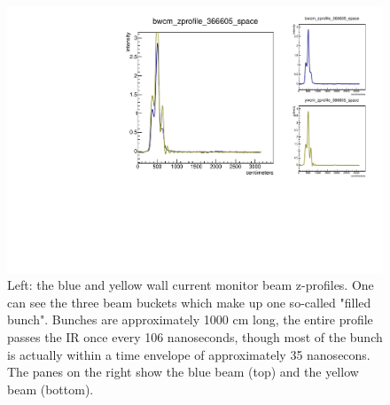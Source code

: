 \begin{figure}
\begin{center}
\includegraphics[width=\linewidth,height=\textheight,keepaspectratio]{../HourglassCorrection/figs/366605_wcm_zprofile}
\caption{ 
Left: the blue and yellow wall current monitor beam z-profiles. One can see the
three beam buckets which make up one so-called "filled bunch". Bunches are
approximately 1000 cm long, the entire profile passes the IR once every 106
nanoseconds, though most of the bunch is actually within a time envelope of
approximately 35 nanosecons. The panes on the right show the blue beam (top)
and the yellow beam (bottom).
}
\label{fig:366605_wcm_zprofile}
\end{center}
\end{figure}
